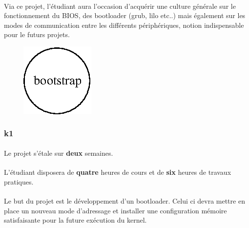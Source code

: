 \documentclass[10pt,a4wide]{article}
\begin{document}
\paragraph{}

Via ce projet, l'\'etudiant aura l'occasion d'acqu\'erir une culture
g\'en\'erale sur le fonctionnement du BIOS, des bootloader (grub, lilo
etc..) mais \'egalement sur les modes de communication entre les
diff\'erents p\'eriph\'eriques, notion indispensable pour le futurs
projets.

\vspace{5cm}

\begin{figure}[h]
\centerline{\includegraphics{figures/k0.eps}}
\end{figure}

\newpage

\subsubsection{k1}

\paragraph{}

Le projet s'\'etale sur \textbf{deux} semaines.

\paragraph{}

L'\'etudiant disposera de \textbf{quatre} heures de cours et de \textbf{six}
heures de travaux pratiques.

\paragraph{}

Le but du projet est le d\'eveloppement d'un bootloader.
Celui ci devra mettre en place un nouveau mode d'adressage et installer
une configuration m\'emoire satisfaisante pour la future ex\'ecution du kernel.
\end{document}
